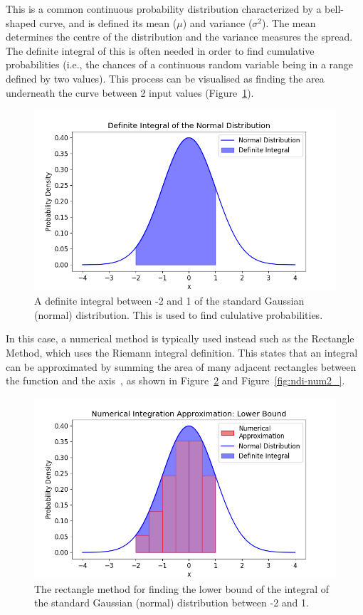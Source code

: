 \documentclass[12pt]{article}
\newcommand{\ndiFigCaption}[1]{The rectangle method for finding the #1 bound of the integral of the standard Gaussian (normal) distribution between -2 and 1.}
\begin{document}
    This is a common continuous probability distribution characterized by a bell-shaped curve, and is defined its mean ($\mu$) and variance ($\sigma^2$). The mean determines the centre of the distribution and the variance measures the spread.
    The definite integral of this is often needed in order to find cumulative probabilities (i.e., the chances of a continuous random variable being in a range defined by two values).
    This process can be visualised as finding the area underneath the curve between 2 input values (Figure~\ref{fig:ndi_}).

    \begin{figure}[htbp]
        \centering
        \includegraphics[width=0.8\linewidth]{figures/ndi/ndi_}
        \caption{A definite integral between -2 and 1 of the standard Gaussian (normal) distribution. This is used to find cululative probabilities.}
        \label{fig:ndi_}
    \end{figure}

    In this case, a numerical method is typically used instead such as the Rectangle Method, which uses the Riemann integral definition.
    This states that an integral can be approximated by summing the area of many adjacent rectangles between the function and the axis~\cite{NumericalAnalysis2023}, as shown in Figure~\ref{fig:ndi-num_} and Figure~\ref{fig:ndi-num2_}.

    \FloatBarrier

    \begin{figure}[htbp]
        \centering
        \includegraphics[width=0.8\linewidth]{figures/ndi-num/ndi-num_}
        \caption{\ndiFigCaption{lower}}
        \label{fig:ndi-num_}
    \end{figure}
\end{document}
